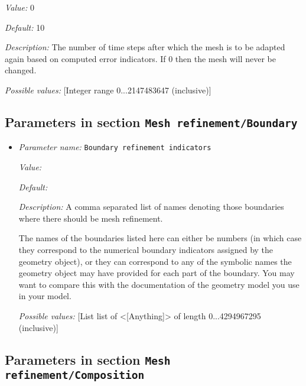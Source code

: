 \begin{itemize}
{\it Value:} 0


{\it Default:} 10


{\it Description:} The number of time steps after which the mesh is to be adapted again based on computed error indicators. If 0 then the mesh will never be changed.


{\it Possible values:} [Integer range 0...2147483647 (inclusive)]
\end{itemize}



\subsection{Parameters in section \tt Mesh refinement/Boundary}
\label{parameters:Mesh_20refinement/Boundary}

\begin{itemize}
\item {\it Parameter name:} {\tt Boundary refinement indicators}
\label{parameters:Mesh refinement/Boundary/Boundary refinement indicators}


{\it Value:} 


{\it Default:} 


{\it Description:} A comma separated list of names denoting those boundaries where there should be mesh refinement.

The names of the boundaries listed here can either be numbers (in which case they correspond to the numerical boundary indicators assigned by the geometry object), or they can correspond to any of the symbolic names the geometry object may have provided for each part of the boundary. You may want to compare this with the documentation of the geometry model you use in your model.


{\it Possible values:} [List list of <[Anything]> of length 0...4294967295 (inclusive)]
\end{itemize}

\subsection{Parameters in section \tt Mesh refinement/Composition}
\label{parameters:Mesh_20refinement/Composition}


